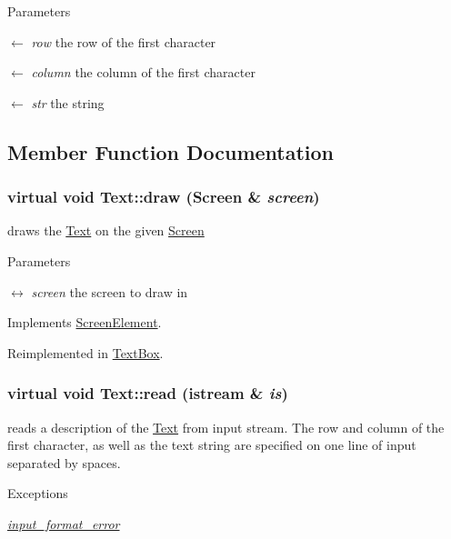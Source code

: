 \begin{DoxyParams}{Parameters}
\item[\mbox{$\leftarrow$} {\em row}]the row of the first character \item[\mbox{$\leftarrow$} {\em column}]the column of the first character \item[\mbox{$\leftarrow$} {\em str}]the string \end{DoxyParams}


\subsection{Member Function Documentation}
\hypertarget{classText_a5fedb2f5b4c40b9cd8965d58716b73f8}{
\subsubsection[{draw}]{\setlength{\rightskip}{0pt plus 5cm}virtual void Text::draw ({\bf Screen} \& {\em screen})}}
\label{classText_a5fedb2f5b4c40b9cd8965d58716b73f8}


draws the \hyperlink{classText}{Text} on the given \hyperlink{classScreen}{Screen} 
\begin{DoxyParams}{Parameters}
\item[\mbox{$\leftrightarrow$} {\em screen}]the screen to draw in \end{DoxyParams}


Implements \hyperlink{classScreenElement_a1bf719edc836cc6ceaa84014c7342028}{ScreenElement}.

Reimplemented in \hyperlink{classTextBox_ae28a00e6cd50d5432c02b579b0fb32ed}{TextBox}.\hypertarget{classText_af326f364609eb7e286ad778accb29db3}{
\subsubsection[{read}]{\setlength{\rightskip}{0pt plus 5cm}virtual void Text::read (istream \& {\em is})}}
\label{classText_af326f364609eb7e286ad778accb29db3}
reads a description of the \hyperlink{classText}{Text} from input stream. The row and column of the first character, as well as the text string are specified on one line of input separated by spaces. 
\begin{DoxyExceptions}{Exceptions}
\item[{\em \hyperlink{classinput__format__error}{input\_\-format\_\-error}}]\end{DoxyExceptions}

